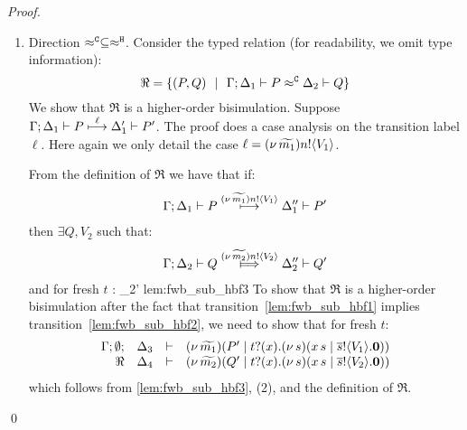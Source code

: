 \begin{proof}
\begin{enumerate}

		\item	Direction $\approx^\mathtt{C} \subseteq \approx^\mathtt{H}$.
				\noi Consider the typed relation (for readability, we omit type information):
				\[
					\Re = \{
								(P, Q) 
								\ \ |\ \ 
								\Gamma; \Delta_1 \vdash P \approx^\mathtt{C} \Delta_2 \vdash Q\}
				\]
				We show that $\Re$ is a higher-order bisimulation.
				Suppose
				$
						\Gamma; \Delta_1 \vdash P \stackrel{ \ell}{\longmapsto} \Delta_1' \vdash P'
				$.
				The proof does a case analysis on the transition label $\ell$.
				Here again we only detail the case $\ell = (\nu\, \widetilde{m_1}) n ! \langle V_1 \rangle$.
				
				\smallskip

							\noi From the definition of $\Re$ we have that if:
							\begin{eqnarray}
								\Gamma; \Delta_1 \vdash P \stackrel{(\nu\, \widetilde{m_1}) n ! \langle V_1 \rangle}{\longmapsto} \Delta_1'' \vdash P'
								\label{lem:fwb_sub_hbf1}
							\end{eqnarray}
							then $\exists Q, V_2$ such that:
							\begin{eqnarray}
								\horel{\Gamma}{\Delta_2}{Q}{\Hby{\news{\widetilde{m_2}} \bactout{n}{V_2}}}{\Delta_2''}{Q'}
								\label{lem:fwb_sub_hbf2}
							\end{eqnarray}
							and for fresh $t$ :
								{\hwb}
								{\Delta_2'}{}
								{lem:fwb_sub_hbf3}
							\noi 
							To show that $\Re$ is a higher-order bisimulation
							after the fact that transition~\eqref{lem:fwb_sub_hbf1} implies transition~\eqref{lem:fwb_sub_hbf2},
							we need to show that for fresh $t$:
							\begin{eqnarray}
								\begin{array}{rcll} \Gamma; \emptyset; &\Delta_3& \vdash& (\nu\, \widetilde{m_1})(P' \;|\; t ? (x) . (\nu\, s)(x\, {s} \;|\; \overline{s} ! \langle V_1 \rangle . \mathbf{0}))\\ \Re &\Delta_4& \vdash &  (\nu\, \widetilde{m_2})(Q' \;|\; t ? (x) . (\nu\, s)(x\, {s} \;|\; \overline{s} ! \langle V_2 \rangle . \mathbf{0})) \end{array}
								\label{lem:fwb_sub_hbf4}
							\end{eqnarray}
							which follows from \eqref{lem:fwb_sub_hbf3}, (2),
							and the definition of $\Re$.

	\end{enumerate}
	\qed
\end{proof}



